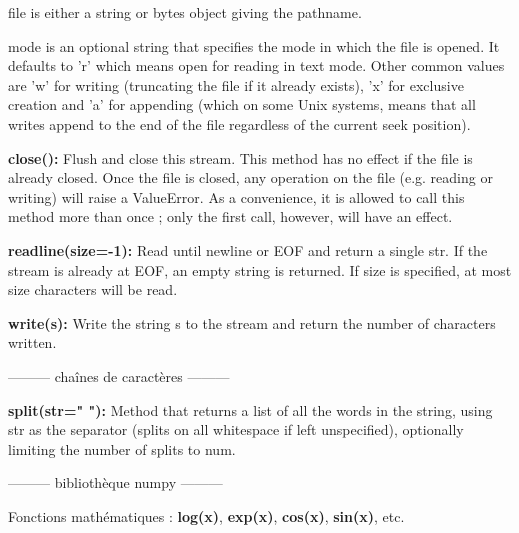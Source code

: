 file is either a string or bytes object giving the pathname.

mode is an optional string that specifies the mode in which the file is opened. It defaults
to 'r' which means open for reading in text mode. Other common values are 'w' for writing
(truncating the file if it already exists), 'x' for exclusive creation and 'a' for appending (which
on some Unix systems, means that all writes append to the end of the file regardless of the
current seek position).

\vspace{.5cm}

\textsf{\textbf{close():}} Flush and close this stream. This method has no effect if the file is already closed.
Once the file is closed, any operation on the file (e.g. reading or writing) will raise a ValueError.
As a convenience, it is allowed to call this method more than once ; only the first call, however,
will have an effect.

\vspace{.5cm}

\textsf{\textbf{readline(size=-1):}} Read until newline or EOF and return a single str. If the stream is already at EOF, an empty string is returned.
If size is specified, at most size characters will be read.

\vspace{.5cm}

\textsf{\textbf{write(s):}} Write the string s to the stream and return the number of characters written.

\begin{center}
--------- chaînes de caractères ---------
\end{center}

\textsf{\textbf{split(str=" "):}} Method that returns a list of all the words in the string, using str as the separator (splits on all whitespace if left unspecified), optionally limiting the number of splits to num.

\begin{center}
--------- bibliothèque numpy ---------
\end{center}

Fonctions mathématiques : \textsf{\textbf{log(x)}}, \textsf{\textbf{exp(x)}}, \textsf{\textbf{cos(x)}}, \textsf{\textbf{sin(x)}}, etc.